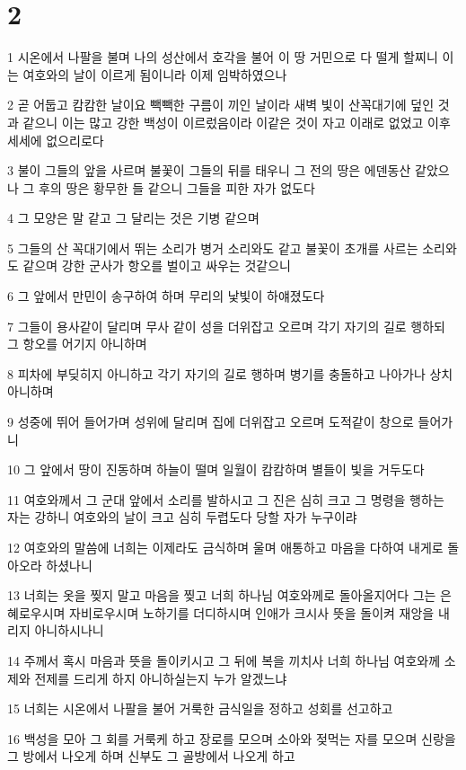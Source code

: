 \chapter{2}

\par 1 시온에서 나팔을 불며 나의 성산에서 호각을 불어 이 땅 거민으로 다 떨게 할찌니 이는 여호와의 날이 이르게 됨이니라 이제 임박하였으나
\par 2 곧 어둡고 캄캄한 날이요 빽빽한 구름이 끼인 날이라 새벽 빛이 산꼭대기에 덮인 것과 같으니 이는 많고 강한 백성이 이르렀음이라 이같은 것이 자고 이래로 없었고 이후 세세에 없으리로다
\par 3 불이 그들의 앞을 사르며 불꽃이 그들의 뒤를 태우니 그 전의 땅은 에덴동산 같았으나 그 후의 땅은 황무한 들 같으니 그들을 피한 자가 없도다
\par 4 그 모양은 말 같고 그 달리는 것은 기병 같으며
\par 5 그들의 산 꼭대기에서 뛰는 소리가 병거 소리와도 같고 불꽃이 초개를 사르는 소리와도 같으며 강한 군사가 항오를 벌이고 싸우는 것같으니
\par 6 그 앞에서 만민이 송구하여 하며 무리의 낯빛이 하얘졌도다
\par 7 그들이 용사같이 달리며 무사 같이 성을 더위잡고 오르며 각기 자기의 길로 행하되 그 항오를 어기지 아니하며
\par 8 피차에 부딪히지 아니하고 각기 자기의 길로 행하며 병기를 충돌하고 나아가나 상치 아니하며
\par 9 성중에 뛰어 들어가며 성위에 달리며 집에 더위잡고 오르며 도적같이 창으로 들어가니
\par 10 그 앞에서 땅이 진동하며 하늘이 떨며 일월이 캄캄하며 별들이 빛을 거두도다
\par 11 여호와께서 그 군대 앞에서 소리를 발하시고 그 진은 심히 크고 그 명령을 행하는 자는 강하니 여호와의 날이 크고 심히 두렵도다 당할 자가 누구이랴
\par 12 여호와의 말씀에 너희는 이제라도 금식하며 울며 애통하고 마음을 다하여 내게로 돌아오라 하셨나니
\par 13 너희는 옷을 찢지 말고 마음을 찢고 너희 하나님 여호와께로 돌아올지어다 그는 은혜로우시며 자비로우시며 노하기를 더디하시며 인애가 크시사 뜻을 돌이켜 재앙을 내리지 아니하시나니
\par 14 주께서 혹시 마음과 뜻을 돌이키시고 그 뒤에 복을 끼치사 너희 하나님 여호와께 소제와 전제를 드리게 하지 아니하실는지 누가 알겠느냐
\par 15 너희는 시온에서 나팔을 불어 거룩한 금식일을 정하고 성회를 선고하고
\par 16 백성을 모아 그 회를 거룩케 하고 장로를 모으며 소아와 젖먹는 자를 모으며 신랑을 그 방에서 나오게 하며 신부도 그 골방에서 나오게 하고
